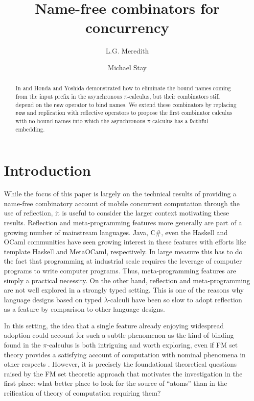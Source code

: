 \documentclass[submission,copyright,creativecommons]{eptcs}
\title{Name-free combinators for concurrency}
\author{L.G. Meredith
\institute{RChain Cooperative\\ Washington State}
\email{lgreg.meredith@rchain.coop}
\and
Michael Stay
\institute{Pyrofex Corp.\\Utah, USA}
\email{\quad stay@pyrofex.net}
}
\newcommand{\new}{\mathsf{new}}
\newcommand{\pic}{$\pi$-calculus}
\theoremstyle{definition}
\theoremstyle{remark}
\theoremstyle{remark}
\begin{document}
\maketitle
\begin{abstract}
\noindent
  In \cite{DBLP:conf/popl/HondaY94} and
  \cite{DBLP:journals/tcs/Yoshida02} Honda and Yoshida demonstrated
  how to eliminate the bound names coming from the input prefix in the
  asynchronous {\pic}, but their combinators still depend on the
  $\new$ operator to bind names.  We extend these combinators by
  replacing $\new$ and replication with reflective operators to
  propose the first combinator calculus with no bound names into which
  the asynchronous {\pic} has a faithful embedding.
\end{abstract}

\section{Introduction}

While the focus of this paper is largely on the technical results of
providing a name-free combinatory account of mobile concurrent
computation through the use of reflection, it is useful to consider
the larger context motivating these results. Reflection and
meta-programming features more generally are part of a growing number
of mainstream languages. Java, C\#, even the Haskell and OCaml
communities have seen growing interest in these features with efforts
like template Haskell and MetaOCaml, respectively. In large measure
this has to do the fact that programming at industrial scale requires
the leverage of computer programs to write computer programs. Thus,
meta-programming features are simply a practical necessity. On the
other hand, reflection and meta-programming are not well explored in a
strongly typed setting. This is one of the reasons why language
designs based on typed $\lambda$-calculi have been so slow to adopt
reflection as a feature by comparison to other language designs.

In this setting, the idea that a single feature already enjoying
widespread adoption could account for such a subtle phenomenon as the
kind of binding found in the {\pic} is both intriguing and worth
exploring, even if FM set theory provides a satisfying account of
computation with nominal phenomena in other respects
\cite{DBLP:journals/fac/GabbayP02}. However, it is precisely the
foundational theoretical questions raised by the FM set theoretic
approach that motivates the investigation in the first place: what
better place to look for the source of ``atoms'' than in the
reification of theory of computation requiring them?
\end{document}
